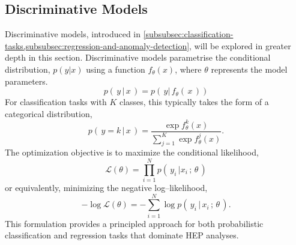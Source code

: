     
        \subsection{Discriminative Models}
            Discriminative models, introduced in \cref{subsubsec:classification-tasks,subsubsec:regression-and-anomaly-detection}, will be explored in greater depth in this section.
            Discriminative models parametrise the conditional distribution, \(p(y|x)\) using a function \(f_\theta(x)\), where \(\theta\) represents the model parameters.
            \begin{equation}
                p(\,y\,|\,x\,) = p(\,y|\,f_\theta(\,x\,))
            \end{equation}
            For classification tasks with \(K\) classes, this typically takes the form of a categorical distribution,
            \begin{equation}
                p(\,y=k\,|\,x\,) = \frac{\exp f_\theta^k(x)}{\sum_{j=1}^K \exp f_\theta^j(x)}.
            \end{equation}
            The optimization objective is to maximize the conditional likelihood,
            \begin{equation}
                \mathcal{L}(\theta) = \prod_{i=1}^N p(\,y_i\,|x_i\,;\, \theta\,)
            \end{equation}
            or equivalently, minimizing the negative log--likelihood,
            \begin{equation}
                -\log \mathcal{L}(\theta) = -\sum_{i=1}^N \log p(\,y_i\,|\,x_i\,;\, \theta\,).
            \end{equation}
            This formulation provides a principled approach for both probabilistic classification and regression tasks that dominate HEP analyses.
        
